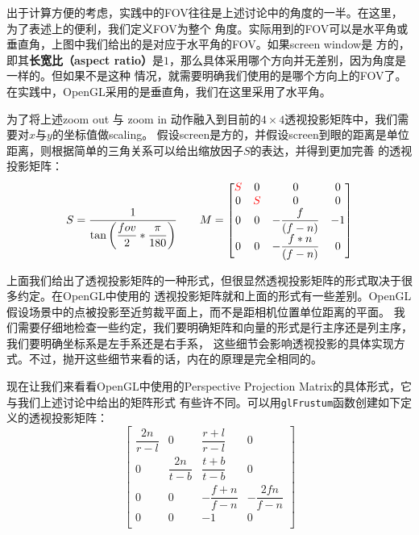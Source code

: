 \documentclass[12pt]{article}
\begin{document}
\indent{}出于计算方便的考虑，实践中的FOV往往是上述讨论中的角度的一半。在这里，为了表述上的便利，我们定义FOV为整个
角度。实际用到的FOV可以是水平角或垂直角，上图中我们给出的是对应于水平角的FOV。如果screen window是
方的，即其\textbf{长宽比（aspect ratio）}是$1$，那么具体采用哪个方向并无差别，因为角度是一样的。但如果不是这种
情况，就需要明确我们使用的是哪个方向上的FOV了。在实践中，OpenGL采用的是垂直角，我们在这里采用了水平角。

\indent{}为了将上述zoom out 与 zoom in 动作融入到目前的$4\times 4$透视投影矩阵中，我们需要对$x$与$y$的坐标值做scaling。
假设screen是方的，并假设screen到眼的距离是单位距离，则根据简单的三角关系可以给出缩放因子$S$的表达，并得到更加完善
的透视投影矩阵：
\begin{displaymath}
S = \frac{1}{\tan\bigg(\dfrac{fov}{2} * \dfrac{\pi}{180}\bigg)}
\quad\quad
M=
\begin{bmatrix}
\color{red}{S} & 0 & 0 & 0 \\
0 & \color{red}{S} & 0 & 0 \\
0 & 0 & -\dfrac{f}{(f-n)} & -1\\
0 & 0 & -\dfrac{f*n}{(f-n)}& 0\\
\end{bmatrix}
\end{displaymath}

\indent{}上面我们给出了透视投影矩阵的一种形式，但很显然透视投影矩阵的形式取决于很多约定。在OpenGL中使用的
透视投影矩阵就和上面的形式有一些差别。OpenGL假设场景中的点被投影至近剪裁平面上，而不是距相机位置单位距离的平面。
我们需要仔细地检查一些约定，我们要明确矩阵和向量的形式是行主序还是列主序，我们要明确坐标系是左手系还是右手系，
这些细节会影响透视投影的具体实现方式。不过，抛开这些细节来看的话，内在的原理是完全相同的。

\indent{}现在让我们来看看OpenGL中使用的Perspective Projection Matrix的具体形式，它与我们上述讨论中给出的矩阵形式
有些许不同。可以用\texttt{glFrustum}函数创建如下定义的透视投影矩阵：
\begin{displaymath}
\left[\begin{array}{cccc}
{ \dfrac{2n}{ r-l } } & 0 & { \dfrac{r + l} { r-l } } & 0 \\
0 & { \dfrac{2n}{ t-b } } & { \dfrac{t + b}{ t-b } } & 0 \\
0 & 0 & -{\dfrac{f+n}{f-n}} & -{\dfrac{2fn}{f-n}}\\
0 & 0 & -1& 0\\
\end{array}\right]
\end{displaymath}
\end{document}
